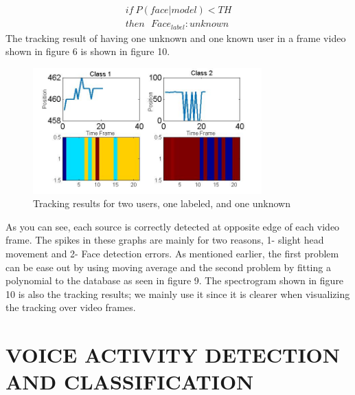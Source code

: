 \documentclass{article}
\begin{document}
\begin{align*}
if \ P(face|model)<TH \\ then\ \ \ 
Face_{label} : unknown
\end{align*}
The tracking result of having one unknown and one known user in a frame video shown in figure 6 is shown in figure 10. 
\begin{figure}[htb]
\begin{minipage}[b]{0.88\linewidth}
\centerline{\includegraphics[width=8.8cm]{3d_audio_tracking_3.jpg}}
\end{minipage}
\caption{Tracking results for two users, one labeled, and one unknown}
\label{fig:res}
\end{figure}
As you can see, each source is correctly detected at opposite edge of each video frame. The spikes in these graphs are mainly for two reasons, 1- slight head movement and 2- Face detection errors. As mentioned earlier, the first problem can be ease out by using moving average and the second problem by fitting a polynomial to the database as seen in figure 9. The spectrogram shown in figure 10 is also the tracking results; we mainly use it since it is clearer when visualizing the tracking over video frames. 
\section{VOICE ACTIVITY DETECTION AND CLASSIFICATION}
\end{document}

